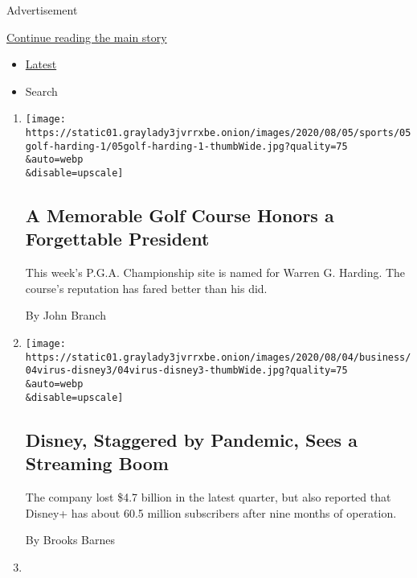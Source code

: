 Advertisement

\protect\hyperlink{after-mid1}{Continue reading the main story}

\begin{itemize}
\tightlist
\item
  \protect\hyperlink{stream-panel}{Latest}
\item
  Search
\end{itemize}

\begin{enumerate}
\def\labelenumi{\arabic{enumi}.}
\item
  \href{/2020/08/05/sports/golf/pga-championship-harding-park.html}{}

  \texttt{[image: https://static01.graylady3jvrrxbe.onion/images/2020/08/05/sports/05golf-harding-1/05golf-harding-1-thumbWide.jpg?quality=75\\\&auto=webp\\\&disable=upscale]}

  \hypertarget{a-memorable-golf-course-honors-a-forgettable-president}{%
  \subsection{A Memorable Golf Course Honors a Forgettable
  President}\label{a-memorable-golf-course-honors-a-forgettable-president}}

  This week's P.G.A. Championship site is named for Warren G. Harding.
  The course's reputation has fared better than his did.

  By John Branch
\item
  \href{/2020/08/04/business/media/disney-earnings-coronavirus.html}{}

  \texttt{[image: https://static01.graylady3jvrrxbe.onion/images/2020/08/04/business/04virus-disney3/04virus-disney3-thumbWide.jpg?quality=75\\\&auto=webp\\\&disable=upscale]}

  \hypertarget{disney-staggered-by-pandemic-sees-a-streaming-boom}{%
  \subsection{Disney, Staggered by Pandemic, Sees a Streaming
  Boom}\label{disney-staggered-by-pandemic-sees-a-streaming-boom}}

  The company lost \$4.7 billion in the latest quarter, but also
  reported that Disney+ has about 60.5 million subscribers after nine
  months of operation.

  By Brooks Barnes
\item
  \href{/2020/08/04/movies/red-penguins-review.html}{}


\end{enumerate}
